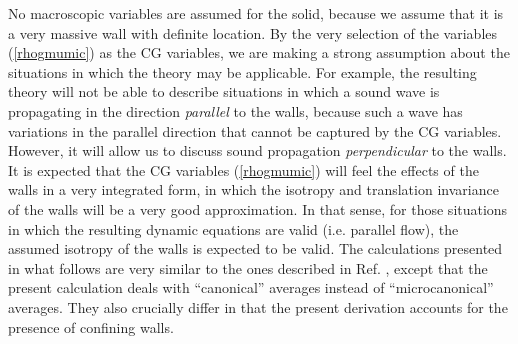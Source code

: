 \documentclass[b5paper,openright,11pt]{book}
\newcommand{\Note}[1]{{\bf \color{red}#1}}    %
\begin{document}
%

No macroscopic variables are assumed  for the solid, because we assume
that it  is a very massive  wall with definite location.   By the very
selection of the  variables (\ref{rhogmumic}) as the  CG variables, we
are  making a  strong assumption  about  the situations  in which  the
theory may be applicable.  For  example, the resulting theory will not
be able to describe situations in which a sound wave is propagating in
the direction \textit{parallel} to the  walls, because such a wave has
variations in the parallel direction that cannot be captured by the CG
variables.  However,  it will  allow us  to discuss  sound propagation
\textit{perpendicular}  to the  walls.   It is  expected  that the  CG
variables (\ref{rhogmumic})  will feel the  effects of the walls  in a
very integrated form, in which the isotropy and translation invariance
of the  walls will be a  very good approximation.  In  that sense, for
those situations  in which the  resulting dynamic equations  are valid
(i.e.  parallel flow),  the assumed isotropy of the  walls is expected
to be  valid.  The  calculations presented in what follows  are very
similar to  the ones described  in Ref. \cite{Donev}, except  that the
present  calculation  deals  with ``canonical''  averages  instead  of
``microcanonical''  averages.  They  also
crucially  differ in  that  the present  derivation  accounts for  the
presence of confining walls.
\end{document}

